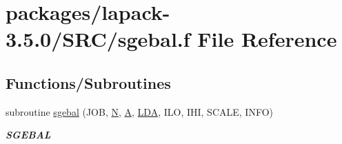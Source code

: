 \hypertarget{sgebal_8f}{}\section{packages/lapack-\/3.5.0/\+S\+R\+C/sgebal.f File Reference}
\label{sgebal_8f}
\subsection*{Functions/\+Subroutines}
\begin{DoxyCompactItemize}
\item 
subroutine \hyperlink{group__realGEcomputational_ga5d3d13fe83e675d743f67f6afdd94041}{sgebal} (J\+O\+B, \hyperlink{polmisc_8c_a0240ac851181b84ac374872dc5434ee4}{N}, \hyperlink{classA}{A}, \hyperlink{example__user_8c_ae946da542ce0db94dced19b2ecefd1aa}{L\+D\+A}, I\+L\+O, I\+H\+I, S\+C\+A\+L\+E, I\+N\+F\+O)
\begin{DoxyCompactList}\small\item\em {\bfseries S\+G\+E\+B\+A\+L} \end{DoxyCompactList}\end{DoxyCompactItemize}
